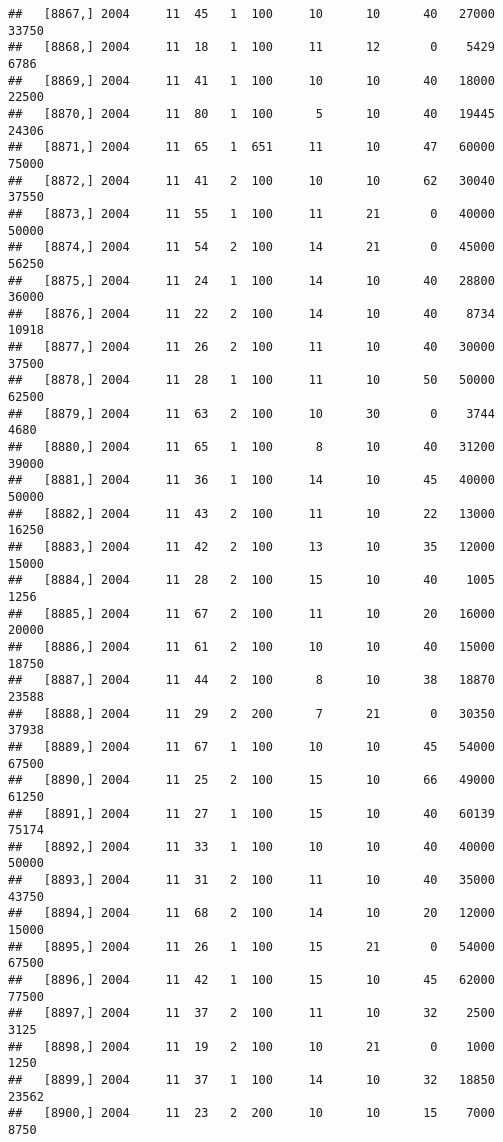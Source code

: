 \documentclass{article}\usepackage[]{graphicx}\usepackage[]{color}
\makeatletter
\newenvironment{kframe}{%
 \def\at@end@of@kframe{}%
 \ifinner\ifhmode%
  \def\at@end@of@kframe{\end{minipage}}%
  \begin{minipage}{\columnwidth}%
 \fi\fi%
 \def\FrameCommand##1{\hskip\@totalleftmargin \hskip-\fboxsep
 \colorbox{shadecolor}{##1}\hskip-\fboxsep
     \hskip-\linewidth \hskip-\@totalleftmargin \hskip\columnwidth}%
 \MakeFramed {\advance\hsize-\width
   \@totalleftmargin\z@ \linewidth\hsize
   \@setminipage}}%
 {\par\unskip\endMakeFramed%
 \at@end@of@kframe}
\newenvironment{knitrout}{}{} %
\makeatother
\begin{document}
\begin{knitrout}
\begin{kframe}
\begin{verbatim}
##   [8867,] 2004     11  45   1  100     10      10      40   27000   33750
##   [8868,] 2004     11  18   1  100     11      12       0    5429    6786
##   [8869,] 2004     11  41   1  100     10      10      40   18000   22500
##   [8870,] 2004     11  80   1  100      5      10      40   19445   24306
##   [8871,] 2004     11  65   1  651     11      10      47   60000   75000
##   [8872,] 2004     11  41   2  100     10      10      62   30040   37550
##   [8873,] 2004     11  55   1  100     11      21       0   40000   50000
##   [8874,] 2004     11  54   2  100     14      21       0   45000   56250
##   [8875,] 2004     11  24   1  100     14      10      40   28800   36000
##   [8876,] 2004     11  22   2  100     14      10      40    8734   10918
##   [8877,] 2004     11  26   2  100     11      10      40   30000   37500
##   [8878,] 2004     11  28   1  100     11      10      50   50000   62500
##   [8879,] 2004     11  63   2  100     10      30       0    3744    4680
##   [8880,] 2004     11  65   1  100      8      10      40   31200   39000
##   [8881,] 2004     11  36   1  100     14      10      45   40000   50000
##   [8882,] 2004     11  43   2  100     11      10      22   13000   16250
##   [8883,] 2004     11  42   2  100     13      10      35   12000   15000
##   [8884,] 2004     11  28   2  100     15      10      40    1005    1256
##   [8885,] 2004     11  67   2  100     11      10      20   16000   20000
##   [8886,] 2004     11  61   2  100     10      10      40   15000   18750
##   [8887,] 2004     11  44   2  100      8      10      38   18870   23588
##   [8888,] 2004     11  29   2  200      7      21       0   30350   37938
##   [8889,] 2004     11  67   1  100     10      10      45   54000   67500
##   [8890,] 2004     11  25   2  100     15      10      66   49000   61250
##   [8891,] 2004     11  27   1  100     15      10      40   60139   75174
##   [8892,] 2004     11  33   1  100     10      10      40   40000   50000
##   [8893,] 2004     11  31   2  100     11      10      40   35000   43750
##   [8894,] 2004     11  68   2  100     14      10      20   12000   15000
##   [8895,] 2004     11  26   1  100     15      21       0   54000   67500
##   [8896,] 2004     11  42   1  100     15      10      45   62000   77500
##   [8897,] 2004     11  37   2  100     11      10      32    2500    3125
##   [8898,] 2004     11  19   2  100     10      21       0    1000    1250
##   [8899,] 2004     11  37   1  100     14      10      32   18850   23562
##   [8900,] 2004     11  23   2  200     10      10      15    7000    8750

\end{verbatim}
\end{kframe}
\end{knitrout}
\end{document}

